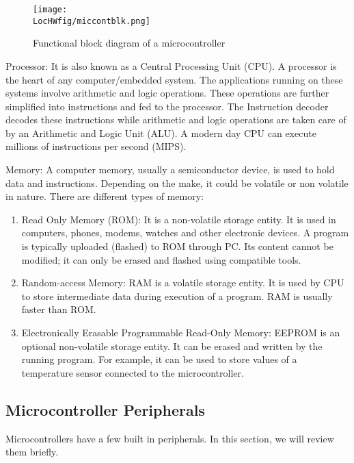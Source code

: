 \begin{figure}
\centering
\texttt{[image: \\LocHWfig/miccontblk.png]}
\caption{Functional block diagram of a microcontroller}
\label{micro-arch}
\end{figure}

\begin{description}
\item {Processor:} It is also known as a Central Processing Unit
  (CPU).  A processor is the heart of any computer/embedded
  system. The applications running on these systems involve arithmetic
  and logic operations. These operations are further simplified into
  instructions and fed to the processor.  The Instruction decoder
  decodes these instructions while arithmetic and logic operations are
  taken care of by an Arithmetic and Logic Unit (ALU). A modern day
  CPU can execute millions of instructions per second (MIPS). 

\item {Memory:}
A computer memory, usually a semiconductor device, is used to hold data and instructions. Depending on the make, it could be volatile or non volatile in nature. There are different types of memory:
\begin{enumerate}
\item Read Only Memory (ROM): It is a non-volatile storage entity. It
  is used in computers, phones, modems, watches and other electronic
  devices. A program is typically uploaded (flashed) to ROM through PC.
  Its content cannot be modified; it can only be erased and flashed
  using compatible tools.
\item Random-access Memory: RAM is a volatile storage entity. It is
  used by CPU to store intermediate data during execution of a
  program. RAM is usually faster than ROM.   
\item Electronically Erasable Programmable Read-Only Memory: EEPROM is
  an optional non-volatile storage entity. It can be erased and
  written by the running program.  For example, it can be used to
  store values of a temperature sensor connected to the microcontroller.
\end{enumerate}
\end{description}

\subsection{Microcontroller Peripherals}
Microcontrollers have a few built in peripherals.  In this section, we
will review them briefly.


